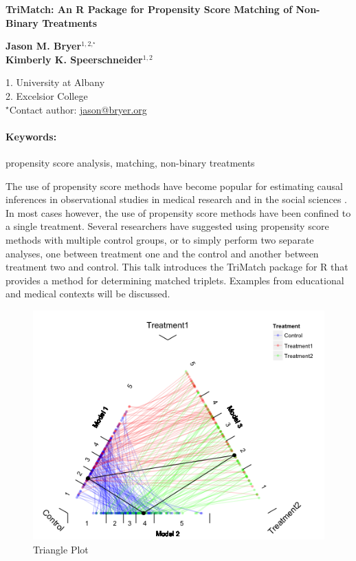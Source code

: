 \documentclass[11pt, a4paper]{article}
\newcommand{\pkg}[1]{{\normalfont\fontseries{b}\selectfont #1}}
\renewcommand{\title}[1]{\begin{center}{\bf \LARGE #1}\end{center}}
\newcommand{\keywords}{\paragraph{Keywords:}}
\begin{document}
\pagestyle{empty}

\title{\pkg{TriMatch}: An R Package for Propensity Score Matching of Non-Binary Treatments}

\begin{center}
  {\bf Jason M. Bryer$^{1,2,^\star}$}\\
  {\bf Kimberly K. Speerschneider$^{1,2}$}
\end{center}

\begin{affiliations}
1. University at Albany \\[-2pt]
2. Excelsior College \\[-2pt]
$^\star$Contact author: \href{mailto:jason@bryer.org}{jason@bryer.org}
\end{affiliations}

\keywords propensity score analysis, matching, non-binary treatments

\vskip 0.8cm

The use of propensity score methods \citep{RosenbaumRubin1983} have become popular for estimating causal inferences in observational studies in medical research \citep{Austin2008} and in the social sciences \citep{ThoemmesKim2011}. In most cases however, the use of propensity score methods have been confined to a single treatment. Several researchers have suggested using propensity score methods with multiple control groups, or to simply perform two separate analyses, one between treatment one and the control and another between treatment two and control. This talk introduces the \pkg{TriMatch} package for R that provides a method for determining matched triplets.  Examples from educational and medical contexts will be discussed.

\begin{figure}
    \vspace{0pt}
    \begin{center}
    \includegraphics[width=.4\textwidth]{matches.png}
    \caption{Triangle Plot}
    \end{center}
    \label{trianglePlot}
\end{figure}
\end{document}
